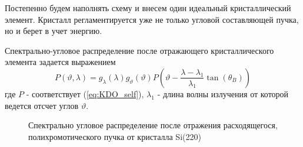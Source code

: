 \label{sec:single_crystal_section}
  Постепенно будем наполнять схему и внесем один идеальный кристаллический элемент.
  Кристалл регламентируется уже не только угловой составляющей пучка, но и берет в учет энергию.

  Спектрально-угловое распределение после отражающего кристаллического элемента задается выражением
  \begin{equation} \label{eq:monochromator_spectra}
    P(\vartheta,\lambda) = g_{\lambda}(\lambda)g_{\vartheta}(\vartheta) P(\vartheta - \frac{\lambda - \lambda_1}{\lambda_1}\tan(\theta_B))
   \end{equation}
где $P$ - соответствует (\ref{eq:KDO_self}), $\lambda_1$ - длина волны излучения от которой ведется отсчет углов $\vartheta$.
\begin{figure}[H]
  \centering
  \hfill

  \caption{Спектрально угловое распределение после отражения расходящегося, полихромотического пучка от кристалла Si(220)}
  \label{ris:single_crystal_schem_lamtet}
\end{figure}

